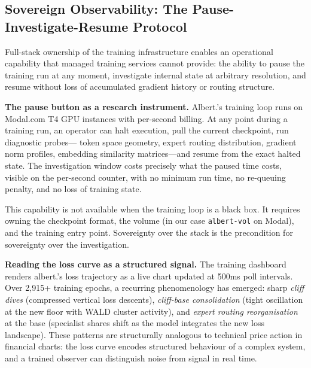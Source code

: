 \documentclass[11pt,a4paper]{article}
\begin{document}
\subsection{Sovereign Observability: The Pause-Investigate-Resume Protocol}
\label{subsec:pause_investigate_resume}

Full-stack ownership of the training infrastructure enables an operational capability
that managed training services cannot provide: the ability to pause the training run
at any moment, investigate internal state at arbitrary resolution, and resume without
loss of accumulated gradient history or routing structure.

\textbf{The pause button as a research instrument.} Albert.'s training loop runs on
Modal.com T4 GPU instances with per-second billing. At any point during a training run,
an operator can halt execution, pull the current checkpoint, run diagnostic probes---
token space geometry, expert routing distribution, gradient norm profiles, embedding
similarity matrices---and resume from the exact halted state. The investigation window
costs precisely what the paused time costs, visible on the per-second counter, with no
minimum run time, no re-queuing penalty, and no loss of training state.

This capability is not available when the training loop is a black box. It requires
owning the checkpoint format, the volume (in our case \texttt{albert-vol} on Modal),
and the training entry point. Sovereignty over the stack is the precondition for
sovereignty over the investigation.

\textbf{Reading the loss curve as a structured signal.} The training dashboard renders
albert.'s loss trajectory as a live chart updated at 500ms poll intervals. Over 2,915+
training epochs, a recurring phenomenology has emerged: sharp \emph{cliff dives}
(compressed vertical loss descents), \emph{cliff-base consolidation} (tight oscillation
at the new floor with WALD cluster activity), and \emph{expert routing reorganisation}
at the base (specialist shares shift as the model integrates the new loss landscape).
These patterns are structurally analogous to technical price action in financial charts:
the loss curve encodes structured behaviour of a complex system, and a trained observer
can distinguish noise from signal in real time.
\end{document}
